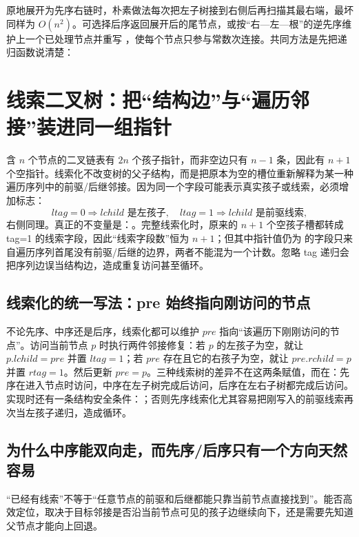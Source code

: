 \documentclass[UTF8,fontset=none,11pt,a4paper]{ctexart}
\begin{document}
原地展开为先序右链时，朴素做法每次把左子树接到右侧后再扫描其最右端，最坏同样为 $O(n^2)$。可选择后序返回展开后的尾节点，或按“右—左—根”的逆先序维护上一个已处理节点并重写 ，使每个节点只参与常数次连接。共同方法是先把递归函数说清楚：

\section{线索二叉树：把“结构边”与“遍历邻接”装进同一组指针}
含 $n$ 个节点的二叉链表有 $2n$ 个孩子指针，而非空边只有 $n-1$ 条，因此有 $n+1$ 个空指针。线索化不改变树的父子结构，而是把原本为空的槽位重新解释为某一种遍历序列中的前驱/后继邻接。因为同一个字段可能表示真实孩子或线索，必须增加标志：
\[
ltag=0\Rightarrow lchild\text{ 是左孩子},\quad
ltag=1\Rightarrow lchild\text{ 是前驱线索},
\]
右侧同理。真正的不变量是：。完整线索化时，原来的 $n+1$ 个空孩子槽都转成 tag=1 的线索字段，因此“线索字段数”恒为 $n+1$；但其中指针值仍为  的字段只来自遍历序列首尾没有前驱/后继的边界，两者不能混为一个计数。忽略 tag 递归会把序列边误当结构边，造成重复访问甚至循环。

\subsection{线索化的统一写法：pre 始终指向刚访问的节点}
不论先序、中序还是后序，线索化都可以维护 $pre$ 指向“该遍历下刚刚访问的节点”。访问当前节点 $p$ 时执行两件邻接修复：若 $p$ 的左孩子为空，就让 $p.lchild=pre$ 并置 $ltag=1$；若 $pre$ 存在且它的右孩子为空，就让 $pre.rchild=p$ 并置 $rtag=1$。然后更新 $pre=p$。三种线索树的差异不在这两条赋值，而在：先序在进入节点时访问，中序在左子树完成后访问，后序在左右子树都完成后访问。实现时还有一条结构安全条件：；否则先序线索化尤其容易把刚写入的前驱线索再次当左孩子递归，造成循环。

\subsection{为什么中序能双向走，而先序/后序只有一个方向天然容易}
“已经有线索”不等于“任意节点的前驱和后继都能只靠当前节点直接找到”。能否高效定位，取决于目标邻接是否沿当前节点可见的孩子边继续向下，还是需要先知道父节点才能向上回退。
\end{document}
